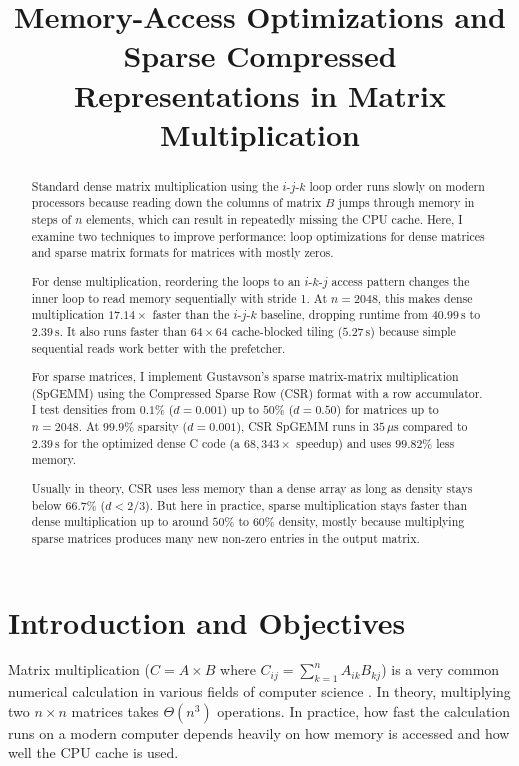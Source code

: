 \documentclass[10pt,conference,a4paper]{IEEEtran}
\begin{document}
\title{Memory-Access Optimizations and Sparse Compressed Representations in Matrix Multiplication}

\author{
}

\maketitle

\begin{abstract}
Standard dense matrix multiplication using the $i\text{-}j\text{-}k$ loop order runs slowly on modern processors because reading down the columns of matrix $B$ jumps through memory in steps of $n$ elements, which can result in repeatedly missing the CPU cache. 
Here, I examine two techniques to improve performance: loop optimizations for dense matrices and sparse matrix formats for matrices with mostly zeros. 

For dense multiplication, reordering the loops to an $i\text{-}k\text{-}j$ access pattern changes the inner loop to read memory sequentially with stride 1. 
At $n=2048$, this makes dense multiplication $17.14\times$ faster than the $i\text{-}j\text{-}k$ baseline, dropping runtime from $40.99\,\text{s}$ to $2.39\,\text{s}$. It also runs faster than $64\times 64$ cache-blocked tiling ($5.27\,\text{s}$) because simple sequential reads work better with the prefetcher. 

For sparse matrices, I implement Gustavson's sparse matrix-matrix multiplication (SpGEMM) using the Compressed Sparse Row (CSR) format with a row accumulator. 
I test densities from $0.1\%$ ($d=0.001$) up to $50\%$ ($d=0.50$) for matrices up to $n=2048$. 
At $99.9\%$ sparsity ($d=0.001$), CSR SpGEMM runs in $35\,\mu\text{s}$ compared to $2.39\,\text{s}$ for the optimized dense C code (a $68{,}343\times$ speedup) and uses $99.82\%$ less memory. 

Usually in theory, CSR uses less memory than a dense array as long as density stays below $66.7\%$ ($d < 2/3$). 
But here in practice, sparse multiplication stays faster than dense multiplication up to around $50\%$ to $60\%$ density, 
mostly because multiplying sparse matrices produces many new non-zero entries in the output matrix.
\end{abstract}

\section{Introduction and Objectives}
Matrix multiplication ($C = A \times B$ where $C_{ij} = \sum_{k=1}^{n} A_{ik} B_{kj}$) is a very common numerical calculation in various fields of computer science \cite{golub2013}. 
In theory, multiplying two $n \times n$ matrices takes $\Theta(n^3)$ operations. 
In practice, how fast the calculation runs on a modern computer depends heavily on how memory is accessed and how well the CPU cache is used.
\end{document}
